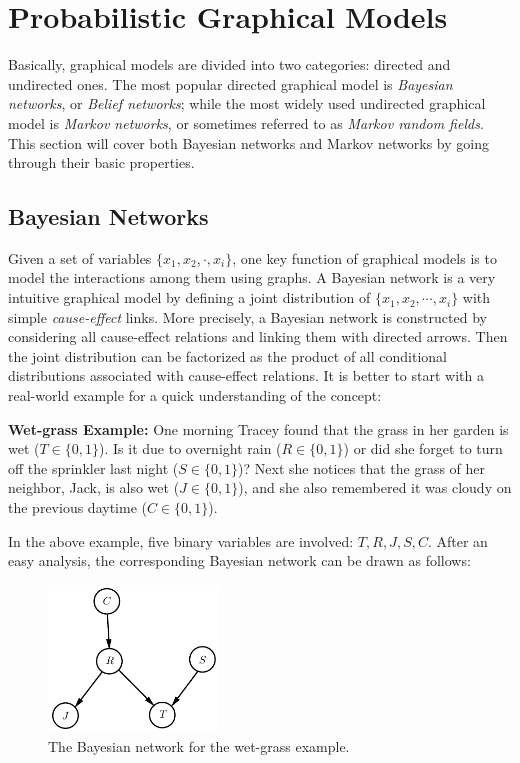 \section{Probabilistic Graphical Models}
\label{sec:PGMs}
Basically, graphical models are divided into two categories: directed and undirected ones. The most popular directed graphical model is \emph{Bayesian networks}, or \emph{Belief networks}; 
while the most widely used undirected graphical model is \emph{Markov networks}, or sometimes referred to as \emph{Markov random fields}. This section will cover both Bayesian networks and 
Markov networks by going through their basic properties.   

\subsection{Bayesian Networks}
Given a set of variables $\{x_1,x_2,\cdot, x_i\}$, one key function of graphical models is to model the interactions among them using graphs. A Bayesian network is a very 
intuitive graphical model by defining a joint distribution of  $\{x_1,x_2,\cdots, x_i\}$ with simple \emph{cause-effect} links. More precisely,  a Bayesian network is constructed by considering 
all cause-effect relations and linking them with directed arrows. Then the joint distribution can be factorized as the product of all conditional distributions associated with cause-effect relations. 
It is better to start with a real-world example \citep{Barber_book} for a 
quick understanding of the concept:   
\begin{shaded}
   \textbf{Wet-grass Example:} One morning Tracey found that the grass in her garden is wet ($T\in\{0,1\}$). Is it due to overnight rain ($R \in\{0,1\}$) or did
she forget to turn off the sprinkler last night ($S\in\{0,1\}$)? Next she notices that the grass of her neighbor, Jack, is also
wet ($J\in\{0,1\}$), and she also remembered it was cloudy on the previous daytime ($C\in\{0,1\}$).                   
\end{shaded}
In the above example, five binary variables are involved: $T,R,J,S,C$. After an easy analysis, the corresponding Bayesian network can be drawn as follows: 
\begin{figure}[h]
   \centering
   \includegraphics[width=0.4\textwidth]{./Figures/wet_glass_BN.pdf}
   \caption{The Bayesian network for the wet-grass example.}
\end{figure}

